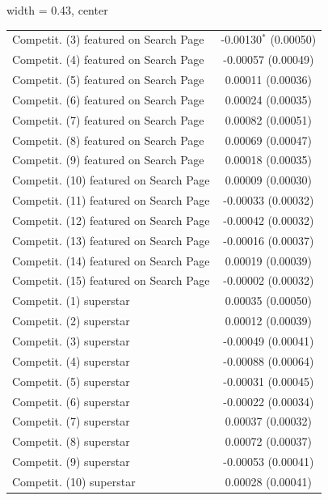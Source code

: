 \begin{table}[htbp]
\begin{adjustbox}{width = 0.43\textwidth, center}
\begin{threeparttable}[b]
\begin{tabular}{lc}
            Competit. (3) featured on Search Page  & -0.00130$^{*}$ (0.00050)\\   
            Competit. (4) featured on Search Page  & -0.00057 (0.00049)\\   
            Competit. (5) featured on Search Page  & 0.00011 (0.00036)\\   
            Competit. (6) featured on Search Page  & 0.00024 (0.00035)\\   
            Competit. (7) featured on Search Page  & 0.00082 (0.00051)\\   
            Competit. (8) featured on Search Page  & 0.00069 (0.00047)\\   
            Competit. (9) featured on Search Page  & 0.00018 (0.00035)\\   
            Competit. (10) featured on Search Page & 0.00009 (0.00030)\\   
            Competit. (11) featured on Search Page & -0.00033 (0.00032)\\   
            Competit. (12) featured on Search Page & -0.00042 (0.00032)\\   
            Competit. (13) featured on Search Page & -0.00016 (0.00037)\\   
            Competit. (14) featured on Search Page & 0.00019 (0.00039)\\   
            Competit. (15) featured on Search Page & -0.00002 (0.00032)\\   
            Competit. (1) superstar                & 0.00035 (0.00050)\\   
            Competit. (2) superstar                & 0.00012 (0.00039)\\   
            Competit. (3) superstar                & -0.00049 (0.00041)\\   
            Competit. (4) superstar                & -0.00088 (0.00064)\\   
            Competit. (5) superstar                & -0.00031 (0.00045)\\   
            Competit. (6) superstar                & -0.00022 (0.00034)\\   
            Competit. (7) superstar                & 0.00037 (0.00032)\\   
            Competit. (8) superstar                & 0.00072 (0.00037)\\   
            Competit. (9) superstar                & -0.00053 (0.00041)\\   
            Competit. (10) superstar               & 0.00028 (0.00041)\\   

\end{tabular}
\end{threeparttable}
\end{adjustbox}
\end{table}
